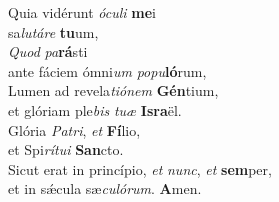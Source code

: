 \evenverse Quia vidérunt \textit{ó}\textit{cu}\textit{li} \textbf{me}i~\*\\
\evenverse sa\textit{lu}\textit{tá}\textit{re} \textbf{tu}um,\\
\oddverse \textit{Quod} \textit{pa}\textbf{rá}sti~\*\\
\oddverse ante fáciem ómni\textit{um} \textit{po}\textit{pu}\textbf{ló}rum,\\
\evenverse Lumen ad revela\textit{ti}\textit{ó}\textit{nem} \textbf{Gén}tium,~\*\\
\evenverse et glóriam ple\textit{bis} \textit{tu}\textit{æ} \textbf{Is}\textbf{ra}ël.\\
\oddverse Glória \textit{Pa}\textit{tri}, \textit{et} \textbf{Fí}lio,~\*\\
\oddverse et Spi\textit{rí}\textit{tu}\textit{i} \textbf{San}cto.\\
\evenverse Sicut erat in princípio, \textit{et} \textit{nunc}, \textit{et} \textbf{sem}per,~\*\\
\evenverse et in sǽcula sæ\textit{cu}\textit{ló}\textit{rum}. \textbf{A}men.\\
